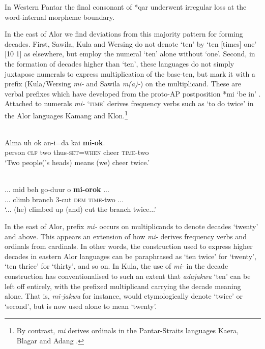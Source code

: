\begin{table}
{\dag}In Western Pantar the final consonant of *qar underwent irregular loss at the word-internal morpheme boundary.

\end{table}


In the east of Alor we find deviations from this majority pattern for forming decades. First, Sawila, Kula and Wersing do not denote `ten' by `ten [times] one' [10 1] as elsewhere, but employ the numeral `ten' alone without `one'. Second, in the formation of decades higher than `ten', these languages do not simply juxtapose numerals to express multiplication of the base-ten, but mark it with a prefix (Kula/Wersing \textit{mi-} and Sawila \textit{m(a)-}) on the multiplicand. These are verbal prefixes which have developed from the proto-AP postposition *mi `be in' \citep{HoltonRobinsonTVhistory}. Attached to numerals  \textit{mi-} \textsc{`time'} derives frequency verbs such as `to do twice' in the Alor languages Kamang and Klon.\footnote{By contrast, \textit{mi} derives ordinals in the Pantar-Straits languages Kaera, Blagar and Adang \citep{KlamerEtAlTV}.}   



\ea%
\label{ex:6:13}
\\
\gll  Alma    uh    ok    an-i{\ng}=da{\ng}    kai    \textbf{mi-ok}.\\
     person  \textsc{clf}  two  thus-\textsc{set=when}  cheer  \textsc{time}{}-two  \\
\glt `Two people('s heads) means (we) cheer twice.'
\z

  







\ea%
\label{ex:6:14}
\\
\gll   ... mid  beh     go-duur  o  \textbf{mi-orok} ...\\
      ... climb  branch    3-cut    \textsc{dem}  \textsc{time}{}-two ... \\
\glt `... (he) climbed up (and) cut the branch twice...'
\z



 



In the east of Alor, prefix \textit{mi-} occurs on multiplicands to denote decades `twenty' and above. This appears an extension of how \textit{mi-}\textsc{} derives frequency verbs and ordinals from cardinals. In other words, the construction used to express higher decades in eastern Alor languages can be paraphrased as `ten twice'  for `twenty', `ten thrice'   for `thirty', and so on. In Kula, the use of \textit{mi-} in the decade construction has conventionalised to such an extent that \textit{adajakwu} `ten' can be left off entirely, with the prefixed multiplicand carrying the decade meaning alone. That is, \textit{mi-jakwu} for instance, would etymologically denote `twice' or `second', but is now used alone to mean `twenty'.

